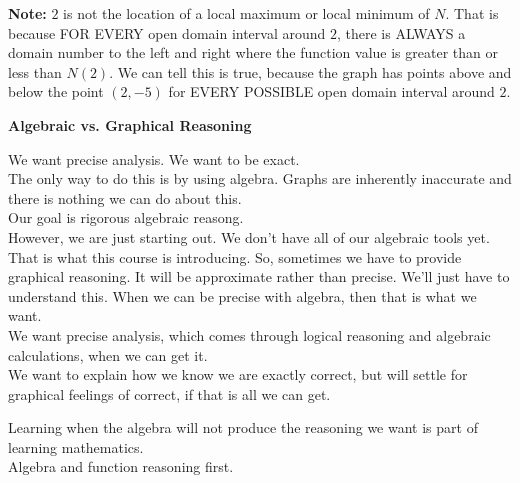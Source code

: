 \documentclass{ximera}
\begin{document}
\textbf{Note:} $2$ is not the location of a local maximum or local minimum of $N$.  That is because FOR EVERY open domain interval around $2$, there is ALWAYS a domain number to the left and right where the function value is greater than or less than $N(2)$.  We can tell this is true, because the graph has points above and below the point $(2, -5)$ for EVERY POSSIBLE open domain interval around $2$. \\













\begin{warning}  \textbf{\textcolor{blue!55!black}{Algebraic vs. Graphical Reasoning}}


We want precise analysis.  We want to be exact. \\


The only way to do this is by using algebra.  Graphs are inherently inaccurate and there is nothing we can do about this. \\


Our goal is rigorous algebraic reasong. \\



However, we are just starting out.  We don't have all of our algebraic tools yet.  That is what this course is introducing.  So, sometimes we have to provide graphical reasoning.  It will be approximate rather than precise.  We'll just have to understand this.  When we can be precise with algebra, then that is what we want. \\


We want precise analysis, which comes through logical reasoning and algebraic calculations, when we can get it. \\


We want to explain how we know we are exactly correct, but will settle for graphical feelings of correct, if that is all we can get. \\


\end{warning}



Learning when the algebra will not produce the reasoning we want is part of learning mathematics.  \\

Algebra and function reasoning first. \\
\end{document}

